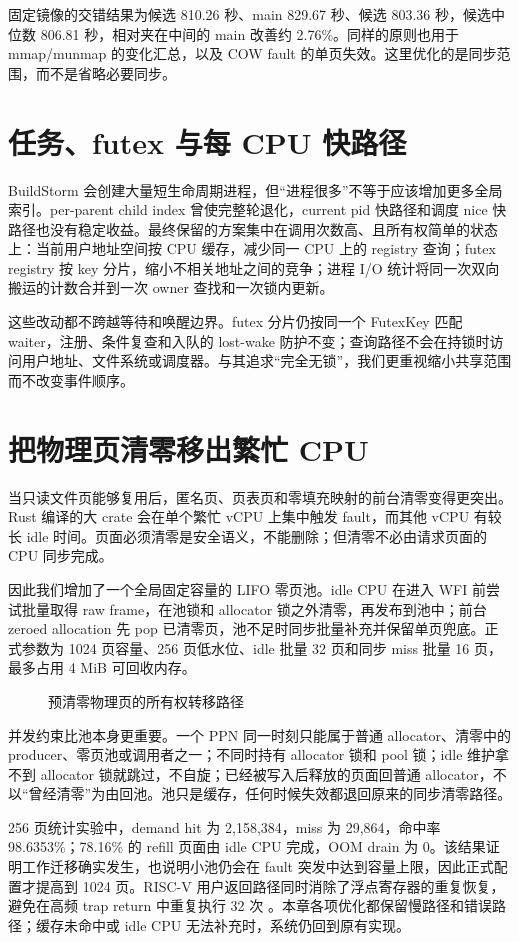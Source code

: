 固定镜像的交错结果为候选 810.26 秒、main 829.67 秒、候选 803.36 秒，候选中位数 806.81 秒，相对夹在中间的 main 改善约 2.76\%。同样的原则也用于 mmap/munmap 的变化汇总，以及 COW fault 的单页失效。这里优化的是同步范围，而不是省略必要同步。

\section{任务、futex 与每 CPU 快路径}

BuildStorm 会创建大量短生命周期进程，但“进程很多”不等于应该增加更多全局索引。per-parent child index 曾使完整轮退化，current pid 快路径和调度 nice 快路径也没有稳定收益。最终保留的方案集中在调用次数高、且所有权简单的状态上：当前用户地址空间按 CPU 缓存，减少同一 CPU 上的 registry 查询；futex registry 按 key 分片，缩小不相关地址之间的竞争；进程 I/O 统计将同一次双向搬运的计数合并到一次 owner 查找和一次锁内更新。

这些改动都不跨越等待和唤醒边界。futex 分片仍按同一个 FutexKey 匹配 waiter，注册、条件复查和入队的 lost-wake 防护不变；查询路径不会在持锁时访问用户地址、文件系统或调度器。与其追求“完全无锁”，我们更重视缩小共享范围而不改变事件顺序。

\section{把物理页清零移出繁忙 CPU}

当只读文件页能够复用后，匿名页、页表页和零填充映射的前台清零变得更突出。Rust 编译的大 crate 会在单个繁忙 vCPU 上集中触发 fault，而其他 vCPU 有较长 idle 时间。页面必须清零是安全语义，不能删除；但清零不必由请求页面的 CPU 同步完成。

因此我们增加了一个全局固定容量的 LIFO 零页池。idle CPU 在进入 WFI 前尝试批量取得 raw frame，在池锁和 allocator 锁之外清零，再发布到池中；前台 zeroed allocation 先 pop 已清零页，池不足时同步批量补充并保留单页兜底。正式参数为 1024 页容量、256 页低水位、idle 批量 32 页和同步 miss 批量 16 页，最多占用 4 MiB 可回收内存。

\begin{figure}[htbp]
  \centering
  \caption{预清零物理页的所有权转移路径}
\end{figure}

并发约束比池本身更重要。一个 PPN 同一时刻只能属于普通 allocator、清零中的 producer、零页池或调用者之一；不同时持有 allocator 锁和 pool 锁；idle 维护拿不到 allocator 锁就跳过，不自旋；已经被写入后释放的页面回普通 allocator，不以“曾经清零”为由回池。池只是缓存，任何时候失效都退回原来的同步清零路径。

256 页统计实验中，demand hit 为 2,158,384，miss 为 29,864，命中率 98.6353\%；78.16\% 的 refill 页面由 idle CPU 完成，OOM drain 为 0。该结果证明工作迁移确实发生，也说明小池仍会在 fault 突发中达到容量上限，因此正式配置才提高到 1024 页。RISC-V 用户返回路径同时消除了浮点寄存器的重复恢复，避免在高频 trap return 中重复执行 32 次 。本章各项优化都保留慢路径和错误路径；缓存未命中或 idle CPU 无法补充时，系统仍回到原有实现。

